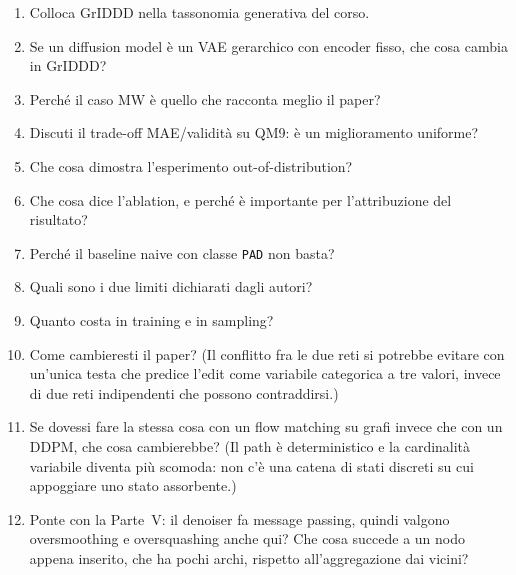\begin{tcolorbox}[mywarn, title={Livello 3 — sai criticarlo e collocarlo}]
\begin{enumerate}
  \item Colloca GrIDDD nella tassonomia generativa del corso.
  \item Se un diffusion model è un VAE gerarchico con encoder fisso, che cosa cambia in GrIDDD?
  \item Perché il caso MW è quello che racconta meglio il paper?
  \item Discuti il trade-off MAE/validità su QM9: è un miglioramento uniforme?
  \item Che cosa dimostra l'esperimento out-of-distribution?
  \item Che cosa dice l'ablation, e perché è importante per l'attribuzione del risultato?
  \item Perché il baseline naive con classe \texttt{PAD} non basta?
  \item Quali sono i due limiti dichiarati dagli autori?
  \item Quanto costa in training e in sampling?
  \item Come cambieresti il paper? (Il conflitto fra le due reti si potrebbe evitare con un'unica testa che predice l'edit come variabile categorica a tre valori, invece di due reti indipendenti che possono contraddirsi.)
  \item Se dovessi fare la stessa cosa con un flow matching su grafi invece che con un DDPM, che cosa cambierebbe? (Il path è deterministico e la cardinalità variabile diventa più scomoda: non c'è una catena di stati discreti su cui appoggiare uno stato assorbente.)
  \item Ponte con la Parte~V: il denoiser fa message passing, quindi valgono oversmoothing e oversquashing anche qui? Che cosa succede a un nodo appena inserito, che ha pochi archi, rispetto all'aggregazione dai vicini?
\end{enumerate}
\end{tcolorbox}
